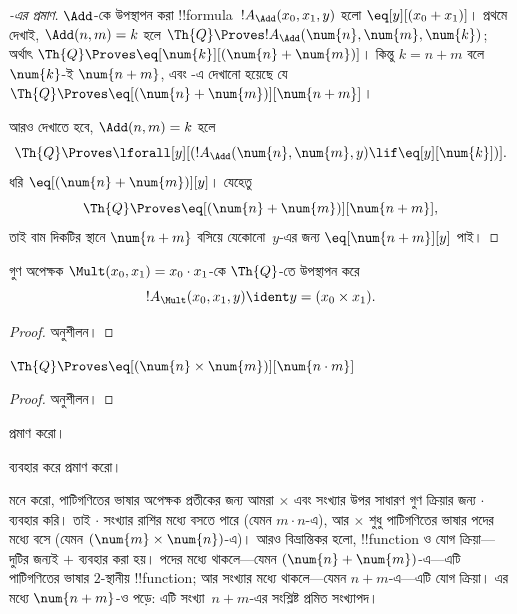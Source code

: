 \documentclass[../../../include/open-logic-section]{subfiles}
\begin{document}
\begin{proof}[-এর প্রমাণ]
$\Add$-কে উপস্থাপন করা !!{formula}~$!A_\Add(x_0, x_1, y)$ হলো
$\eq[y][(x_0 + x_1)]$। প্রথমে দেখাই, $\Add(n, m) = k$ হলে
$\Th{Q} \Proves !A_\Add(\num{n}, \num{m}, \num{k})$; অর্থাৎ
$\Th{Q} \Proves \eq[\num{k}][(\num{n} + \num{m})]$। কিন্তু
$k = n + m$ বলে $\num{k}$-ই $\num{n+m}$, এবং
-এ দেখানো হয়েছে যে
$\Th{Q} \Proves \eq[(\num{n} + \num{m})][\num{n+m}]$।

আরও দেখাতে হবে, $\Add(n, m) = k$ হলে
\[
\Th{Q} \Proves \lforall[y][(!A_\Add(\num{n}, \num{m}, y) \lif
  \eq[y][\num{k}])].
\]
ধরি $\eq[(\num{n} + \num{m})][y]$। যেহেতু
\[
\Th{Q} \Proves \eq[(\num{n}+\num{m})][\num{n+m}],
\]
তাই বাম দিকটির স্থানে $\num{n+m}$ বসিয়ে যেকোনো~$y$-এর জন্য
$\eq[\num{n+m}][y]$ পাই।
\end{proof}

\begin{prop}
গুণ অপেক্ষক $\Mult(x_0, x_1) = x_0 \cdot x_1$-কে $\Th{Q}$-তে উপস্থাপন করে
\[
  !A_{\Mult}(x_0, x_1, y) \ident y = (x_0 \times x_1).
\]
\end{prop}

\begin{proof} অনুশীলন। \end{proof}

\begin{lem}
$\Th{Q} \Proves \eq[(\num{n} \times \num{m})][\num{n \cdot m}]$
\end{lem}

\begin{proof} অনুশীলন। \end{proof}

\begin{prob}
 প্রমাণ করো।
\end{prob}

\begin{prob}
 ব্যবহার করে
 প্রমাণ করো।
\end{prob}

\begin{explain}
  মনে করো, পাটিগণিতের ভাষার অপেক্ষক প্রতীকের জন্য আমরা $\times$ এবং সংখ্যার
  উপর সাধারণ গুণ ক্রিয়ার জন্য $\cdot$ ব্যবহার করি। তাই $\cdot$ সংখ্যার
  রাশির মধ্যে বসতে পারে (যেমন $m \cdot n$-এ), আর $\times$ শুধু পাটিগণিতের
  ভাষার পদের মধ্যে বসে (যেমন $(\num{m} \times \num{n})$-এ)। আরও বিভ্রান্তিকর
  হলো, !!{function} ও যোগ ক্রিয়া—দুটির জন্যই $+$ ব্যবহার করা হয়। পদের মধ্যে
  থাকলে—যেমন $(\num{n} + \num{m})$-এ—এটি পাটিগণিতের ভাষার $2$-স্থানীয়
  !!{function}; আর সংখ্যার মধ্যে থাকলে—যেমন $n+m$-এ—এটি যোগ ক্রিয়া। এর
  মধ্যে $\num{n+m}$-ও পড়ে: এটি সংখ্যা~$n+m$-এর সংশ্লিষ্ট প্রমিত সংখ্যাপদ।
\end{explain}
\end{document}
